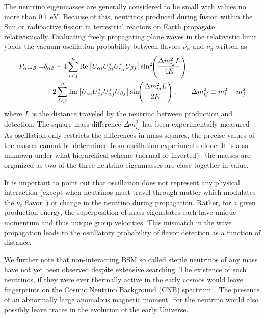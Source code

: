 \documentclass[universe,article,submit,moreauthors,pdftex,a4paper]{Definitions/mdpi}
\newcommand{\eV}{\text{ eV}}
\newcommand*{\xblue}{\color{blue}}
\begin{document}
The neutrino eigenmasses are generally considered to be small with values no more than $0.1\eV$. Because of this, neutrinos produced during fusion within the Sun or radioactive fission in terrestrial reactors on Earth propagate relativistically. Evaluating freely propagating plane waves in the relativistic limit yields the vacuum oscillation probability between flavors $\nu_\alpha$ and $\nu_\beta$ written as~\cite{ParticleDataGroup:2022pth}
\begin{align}\label{NuOscillation}
  P_{\alpha\rightarrow\beta}
 =&\delta_{\alpha\beta}-4\sum_{i<j}^n \mathrm{Re}\left[U_{\alpha i}U^\ast_{\beta i}U^\ast_{\alpha j}U_{\beta j}\right]\sin^2\!\!\left(\frac{\Delta m^2_{ij}L}{4E}\right)\notag\\
 &+2\sum_{i<j}^n \mathrm{Im}\left[U_{\alpha i}U^\ast_{\beta i}U^\ast_{\alpha j}U_{\beta j}\right]\sin\!\!\left(\frac{\Delta m^2_{ij}L}{2E}\right)
 ,\qquad\Delta m^2_{ij}\equiv{m^2_i-m^2_j}
\end{align}
where $L$ is the distance traveled by the neutrino between production and detection. The square mass difference $\Delta m^2_{ij}$ has been experimentally measured~\cite{ParticleDataGroup:2022pth}. As oscillation only restricts the differences in mass squares, the precise values of the masses cannot be determined from oscillation experiments alone. It is also unknown under what hierarchical scheme (normal or inverted)~\cite{Avignone:2007fu,Esteban:2020cvm} the masses are organized as two of the three neutrino eigenmasses are close together in value. 

It is important to point out that oscillation does not represent any physical interaction (except when neutrinos must travel through matter which modulates the $\nu_{e}$ flavor~\cite{NuSTEC:2017hzk,DUNE:2020ypp}) or change in the neutrino during propagation. Rather, for a given production energy, the superposition of mass eigenstates each have unique momentum and thus unique group velocities. This mismatch in the wave propagation leads to the oscillatory probability of flavor detection as a function of distance.

{\xblue We further note that non-interacting BSM so called}
sterile neutrinos of any mass have not yet been observed despite extensive searching. The existence of such neutrinos, if they were ever thermally active in the early cosmos would leave fingerprints on the Cosmic Neutrino Background (CNB) spectrum~\cite{Birrell:2014qna}. The presence of an abnormally large anomalous magnetic moment~\cite{Morgan:1981zy,Fukugita:1987uy,Vogel:1989iv,Elmfors:1997tt,Giunti:2008ve,Giunti:2014ixa,Canas:2015yoa} for the neutrino would also possibly leave traces in the evolution of the early Universe.
\end{document}
